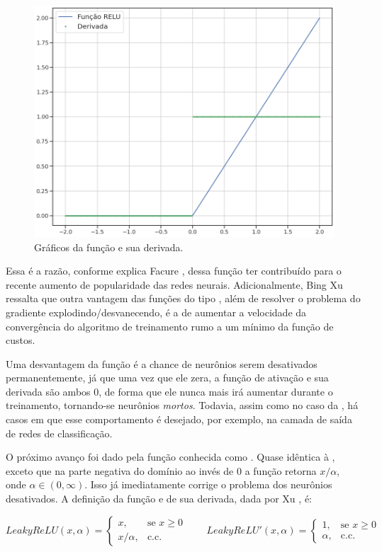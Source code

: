 \begin{figure}[htb]
\centering
\includegraphics[width=12cm]{figuras/relu}
\caption{Gráficos da função  e sua derivada.}
\label{fig:relu}
\end{figure}

Essa é a razão, conforme explica Facure \citep{matheus}, dessa função ter contribuído para o recente aumento de popularidade das redes neurais. Adicionalmente, Bing Xu \citep{xu_relu} ressalta que outra vantagem das funções do tipo , além de resolver o problema do gradiente explodindo/desvanecendo, é a de aumentar a velocidade da convergência do algoritmo de treinamento rumo a um mínimo da função de custos.

Uma desvantagem da função  é a chance de neurônios serem desativados permanentemente, já que uma vez que ele zera, a função de ativação e sua derivada são ambos $0$, de forma que ele nunca mais irá aumentar durante o treinamento, tornando-se neurônios \emph{mortos}. Todavia, assim como no caso da , há casos em que esse comportamento é desejado, por exemplo, na camada de saída de redes de classificação.

O próximo avanço foi dado pela função conhecida como . Quase idêntica à , exceto que na parte negativa do domínio ao invés de $0$ a função retorna $x/\alpha$, onde $\alpha \in (0, \infty)$. Isso já imediatamente corrige o problema dos neurônios desativados. A definição da função e de sua derivada, dada por Xu \citep{xu_relu}, é:

\[
LeakyReLU(x, \alpha) = 
\begin{cases}
    	x, & \text{se } x\ge 0\\
    	x/\alpha, & \text{c.c.}
	\end{cases}
\quad \quad  
LeakyReLU'(x, \alpha) =
	\begin{cases}
    	1, & \text{se } x\ge 0\\
    	\alpha, & \text{c.c.}
	\end{cases}
\]

